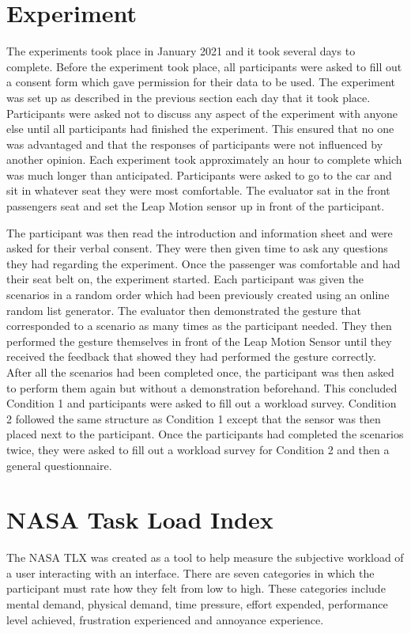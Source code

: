\documentclass{l4proj}
\begin{document}
\section{Experiment}
The experiments took place in January 2021 and it took several days to complete. Before the experiment took place, all participants were asked to fill out a consent form which gave permission for their data to be used. The experiment was set up as described in the previous section each day that it took place. Participants were asked not to discuss any aspect of the experiment with anyone else until all participants had finished the experiment. This ensured that no one was advantaged and that the responses of participants were not influenced by another opinion. Each experiment took approximately an hour to complete which was much longer than anticipated. Participants were asked to go to the car and sit in whatever seat they were most comfortable. The evaluator sat in the front passengers seat and set the Leap Motion sensor up in front of the participant. 

The participant was then read the introduction and information sheet and were asked for their verbal consent. They were then given time to ask any questions they had regarding the experiment. Once the passenger was comfortable and had their seat belt on, the experiment started. Each participant was given the scenarios in a random order which had been previously created using an online random list generator. The evaluator then demonstrated the gesture that corresponded to a scenario as many times as the participant needed. They then performed the gesture themselves in front of the Leap Motion Sensor until they received the feedback that showed they had performed the gesture correctly. After all the scenarios had been completed once, the participant was then asked to perform them again but without a demonstration beforehand. This concluded Condition 1 and participants were asked to fill out a workload survey. Condition 2 followed the same structure as Condition 1 except that the sensor was then placed next to the participant. Once the participants had completed the scenarios twice, they were asked to fill out a workload survey for Condition 2 and then a general questionnaire. 

\section{NASA Task Load Index}
The NASA TLX was created as a tool to help measure the subjective workload of a user interacting with an interface. There are seven categories in which the participant must rate how they felt from low to high. These categories include mental demand, physical demand, time pressure, effort expended, performance level achieved, frustration experienced and annoyance experience.
\end{document}
